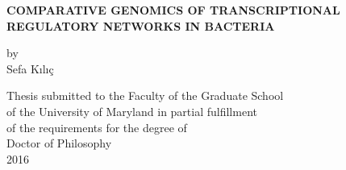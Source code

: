 \begin{titlepage}
\mbox{}\vspace{1in}
\begin{center}

    {\Large \bf COMPARATIVE GENOMICS OF TRANSCRIPTIONAL REGULATORY NETWORKS IN BACTERIA \par}

\vspace{2in}

    {\large by} \\
    {\large Sefa Kılıç}

\vspace{2in}

  \begin{singlespace}
    Thesis submitted to the Faculty of the Graduate School \\
    of the University of Maryland in partial fulfillment \\
    of the requirements for the degree of \\
    Doctor of Philosophy \\
    2016
	\end{singlespace}
\end{center}
\end{titlepage}
